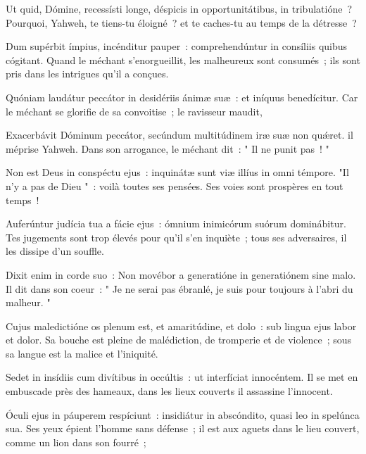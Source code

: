 \begin{paracol}{2}

\LigneParacol{0cm}
{Ut quid, Dómine, recessísti longe, \GreStar{} déspicis in opportunitátibus, in tribulatióne~?}
{Pourquoi, Yahweh, te tiens-tu éloigné~? et te caches-tu au temps de la détresse~? }

\LigneParacol{0.2cm}
{Dum supérbit ímpius, incénditur pauper~: \GreStar{} comprehendúntur in consíliis quibus cógitant.}
{Quand le méchant s'enorgueillit, les malheureux sont consumés~; ils sont pris dans les intrigues qu'il a conçues. }

\LigneParacol{0.2cm}
{Quóniam laudátur peccátor in desidériis ánimæ suæ~: \GreStar{} et iníquus benedícitur.}
{Car le méchant se glorifie de sa convoitise~; le ravisseur maudit,}

\LigneParacol{0.2cm}
{Exacerbávit Dóminum peccátor, \GreStar{} secúndum multitúdinem iræ suæ non quǽret.}
{il méprise Yahweh. Dans son arrogance, le méchant dit~: " Il ne punit pas~! "}

\LigneParacol{0.2cm}
{Non est Deus in conspéctu ejus~: \GreStar{} inquinátæ sunt viæ illíus in omni témpore.}
{"Il n'y a pas de Dieu "~: voilà toutes ses pensées. Ses voies sont prospères en tout temps~!}

\LigneParacol{0.2cm}
{Auferúntur judícia tua a fácie ejus~: \GreStar{} ómnium inimicórum suórum dominábitur.}
{Tes jugements sont trop élevés pour qu'il s'en inquiète~; tous ses adversaires, il les dissipe d'un souffle. }

\LigneParacol{0.2cm}
{Dixit enim in corde suo~: \GreStar{} Non movébor a generatióne in generatiónem sine malo.}
{Il dit dans son coeur~: " Je ne serai pas ébranlé, je suis pour toujours à l'abri du malheur. " }

\LigneParacol{0.2cm}
{Cujus maledictióne os plenum est, et amaritúdine, et dolo~: \GreStar{} sub lingua ejus labor et dolor.}
{Sa bouche est pleine de malédiction, de tromperie et de violence~; sous sa langue est la malice et l'iniquité. }

\LigneParacol{0.2cm}
{Sedet in insídiis cum divítibus in occúltis~: \GreStar{} ut interfíciat innocéntem.}
{Il se met en embuscade près des hameaux, dans les lieux couverts il assassine l'innocent.}

\LigneParacol{0.2cm}
{Óculi ejus in páuperem respíciunt~: \GreStar{} insidiátur in abscóndito, quasi leo in spelúnca sua.}
{Ses yeux épient l'homme sans défense~; il est aux aguets dans le lieu couvert, comme un lion dans son fourré~;}


\end{paracol}
